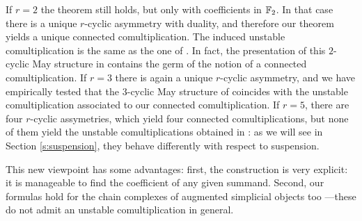 If $r=2$ the theorem still holds, but only with coefficients in $\mathbb{F}_2$.
In that case there is a unique $r$-cyclic asymmetry with duality, and therefore our theorem yields a unique connected comultiplication.
The induced unstable comultiplication is the same as the one of \cite{medina2021may_st}.
In fact, the presentation of this $2$-cyclic May structure in \cite{medina2021fast_sq} contains the germ of the notion of a connected comultiplication.
If $r=3$ there is again a unique $r$-cyclic asymmetry, and we have empirically tested that the $3$-cyclic May structure of \cite{medina2021may_st} coincides with the unstable comultiplication associated to our connected comultiplication.
If $r= 5$, there are four $r$-cyclic assymetries, which yield four connected comultiplications, but none of them yield the unstable comultiplications obtained in \cite{medina2021may_st}: as we will see in Section \ref{s:suspension}, they behave differently with respect to suspension.

This new viewpoint has some advantages: first, the construction is very explicit: it is manageable to find the coefficient of any given summand.
Second, our formulas hold for the chain complexes of augmented simplicial objects too ---these do not admit an unstable comultiplication in general.

